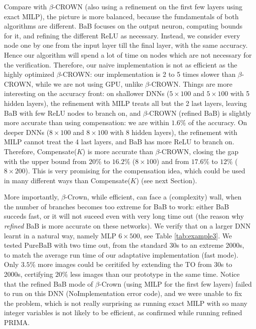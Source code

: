 \documentclass{llncs}
\begin{document}
Compare with $\beta$-CROWN (also using a refinement on the first few layers using exact MILP), 
the picture is more balanced, because the fundamentals of both algorithms are different. BaB 
focuses on the output neuron, computing bounds for it, and refining the different ReLU as necessary. 
Instead, we consider every node one by one from the input layer till the final layer, with the same accuracy. Hence our algorithm will spend a lot of time on nodes which are not necessary for the verification. Therefore, our naive implementation is not as efficient as the highly optimized
$\beta$-CROWN: our implementation is 2 to 5 times slower than $\beta$-CROWN, while we are not using GPU, unlike $\beta$-CROWN. Things are more interesting on the accuracy front: on shallower DNNs ($5 \times 100$ and $5 \times 100$ with 5 hidden layers), the refinement with MILP treats all but the 2 last layers, 
leaving BaB with few ReLU nodes to branch on, and $\beta$-CROWN (refined BaB) is slightly more accurate than using compensation: we are within $1.6\%$ of the accuracy. On deeper DNNs ($8 \times 100$ and $8 \times 100$ with 8 hidden layers), the refinement with MILP cannot treat the 4 last layers, and BaB has more ReLU to branch on. Therefore, Compensate($K$) is more accurate than $\beta$-CROWN, 
closing the gap with the upper bound from $20\%$ to $16.2\%$ ($8 \times 100$)
and from $17.6\%$ to $12\%$ ($8 \times 200$). This is very promising for the compensation idea, which could be used in many different ways than Compensate($K$) (see next Section).
 

More importantly, $\beta$-Crown, while efficient, can face a (complexity) wall, when the number of branches becomes too extreme for BaB to work: either BaB succeds fast, or it will not suceed even with very long time out (the reason why {\em refined} BaB is more accurate on these networks). We verify that on a larger DNN learnt in a natural way, namely MLP $6 \times 500$, see Table \ref{tab:example3}.
We tested PureBaB with two time out, from the standard 30s to an extreme 2000s, to match the average run time of our adaptative implementation (fast mode). Only $3.5\%$ more images could be ceritifed by extending the TO from 30s to 2000s, certifying $20\%$ less images than our prototype in the same time.
Notice that the refined BaB mode of $\beta$-Crown (using MILP for the first few layers) failed to run on this DNN (NoImplementation error code), and we were unable to fix the problem, which is not really surprising as running exact MILP with so many integer variables is not likely to be efficient, as 
confirmed while running refined PRIMA.
\end{document}
